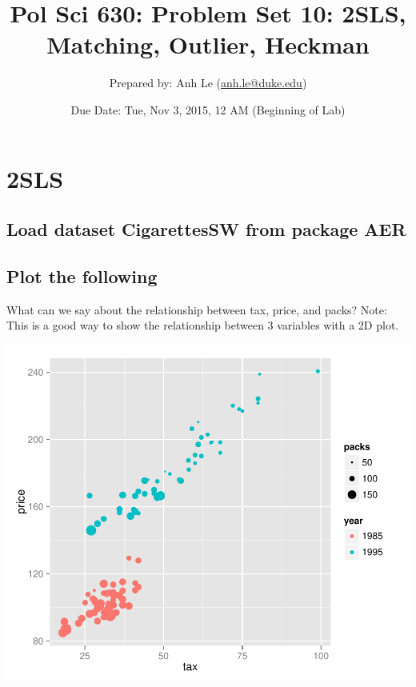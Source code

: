 \documentclass{article}\usepackage[]{graphicx}\usepackage[]{color}
\makeatletter
\def\maxwidth{ %
  \ifdim\Gin@nat@width>\linewidth
    \linewidth
  \else
    \Gin@nat@width
  \fi
}
\newenvironment{knitrout}{}{} %
\makeatother
\begin{document}
\title{Pol Sci 630:  Problem Set 10: 2SLS, Matching, Outlier, Heckman}

\author{Prepared by: Anh Le (\href{mailto:anh.le@duke.edu}{anh.le@duke.edu})}

\date{Due Date: Tue, Nov 3, 2015, 12 AM (Beginning of Lab)}

\maketitle

\section{2SLS}

\subsection{Load dataset CigarettesSW from package AER}

\subsection{Plot the following}

What can we say about the relationship between tax, price, and packs? Note: This is a good way to show the relationship between 3 variables with a 2D plot.

\begin{knitrout}
\color{fgcolor}
\includegraphics[width=\maxwidth]{figure/unnamed-chunk-1-1} 

\end{knitrout}
\end{document}
